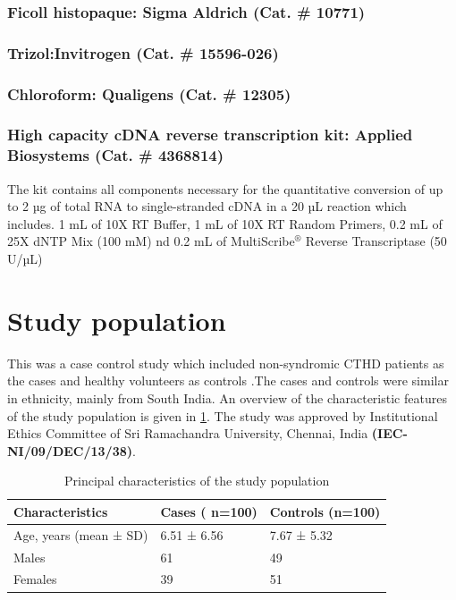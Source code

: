 \begin{refsection}
\subsubsection{Ficoll histopaque: \textmd{Sigma Aldrich (Cat. \# 10771)}}
\subsubsection{Trizol:\textmd{Invitrogen (Cat. \# 15596-026)}}
\subsubsection{Chloroform: \textmd{Qualigens (Cat. \# 12305)}} 
\subsubsection{High capacity cDNA reverse transcription kit: \textmd{Applied Biosystems (Cat. \# 4368814)}}
The kit contains all components necessary for the quantitative conversion of up to 2 µg of total RNA to single-stranded cDNA in a 20 µL reaction which includes. 1 mL of 10X RT Buffer, 1 mL of 10X RT Random Primers, 0.2 mL of 25X dNTP Mix (100 mM) nd 0.2 mL of MultiScribe$^®$ Reverse Transcriptase (50 U/µL)


\section{Study population}
This was a case control study which included non-syndromic CTHD patients as the cases and healthy volunteers as controls .The cases and controls were similar in ethnicity, mainly from South India. An overview of the characteristic features of the study population is given in \cref{tab:2.1studypopulation}. The study was approved by Institutional Ethics Committee of Sri Ramachandra University, Chennai, India \textbf{(IEC- NI/09/DEC/13/38)}. 


\begin{table}[th]
\centering
\caption{Principal characteristics of the study population}
\label{tab:2.1studypopulation}
\begin{tabular}{  l  l  l  }
\hline
	Characteristics & Cases ( n=100) & Controls (n=100) \\ \hline
	Age, years (mean ± SD) & 6.51 ± 6.56 & 7.67 ± 5.32 \\ \hline
	Males & 61 & 49 \\ \hline
	Females & 39 & 51 \\ \hline
\end{tabular}
\end{table}


\end{refsection}
